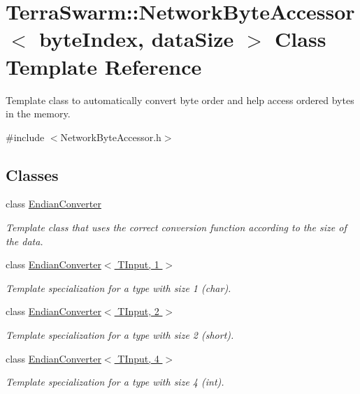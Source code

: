 \hypertarget{class_terra_swarm_1_1_network_byte_accessor}{\section{Terra\-Swarm\-:\-:Network\-Byte\-Accessor$<$ byte\-Index, data\-Size $>$ Class Template Reference}
\label{class_terra_swarm_1_1_network_byte_accessor}
}


Template class to automatically convert byte order and help access ordered bytes in the memory.  




{\ttfamily \#include $<$Network\-Byte\-Accessor.\-h$>$}

\subsection*{Classes}
\begin{DoxyCompactItemize}
\item 
class \hyperlink{class_terra_swarm_1_1_network_byte_accessor_1_1_endian_converter}{Endian\-Converter}
\begin{DoxyCompactList}\small\item\em Template class that uses the correct conversion function according to the size of the data. \end{DoxyCompactList}\item 
class \hyperlink{class_terra_swarm_1_1_network_byte_accessor_1_1_endian_converter_3_01_t_input_00_011_01_4}{Endian\-Converter$<$ T\-Input, 1 $>$}
\begin{DoxyCompactList}\small\item\em Template specialization for a type with size 1 (char). \end{DoxyCompactList}\item 
class \hyperlink{class_terra_swarm_1_1_network_byte_accessor_1_1_endian_converter_3_01_t_input_00_012_01_4}{Endian\-Converter$<$ T\-Input, 2 $>$}
\begin{DoxyCompactList}\small\item\em Template specialization for a type with size 2 (short). \end{DoxyCompactList}\item 
class \hyperlink{class_terra_swarm_1_1_network_byte_accessor_1_1_endian_converter_3_01_t_input_00_014_01_4}{Endian\-Converter$<$ T\-Input, 4 $>$}
\begin{DoxyCompactList}\small\item\em Template specialization for a type with size 4 (int). \end{DoxyCompactList}\end{DoxyCompactItemize}

